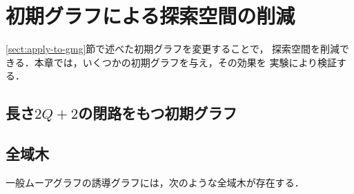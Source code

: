 
\chapter{初期グラフによる探索空間の削減}
\label{chap:reduce-by-initial-graph}
\ref{sect:apply-to-gmg}節で述べた初期グラフを変更することで，
探索空間を削減できる．本章では，いくつかの初期グラフを与え，その効果を
実験により検証する．

\section{長さ$2Q+2$の閉路をもつ初期グラフ}
\label{sect:initial-graph-cycle}

\section{全域木}
\label{sect:initial-spanning-tree}
\begin{conjecture}[全域木予想]
一般ムーアグラフの誘導グラフには，次のような全域木が存在する．
\end{conjecture}

